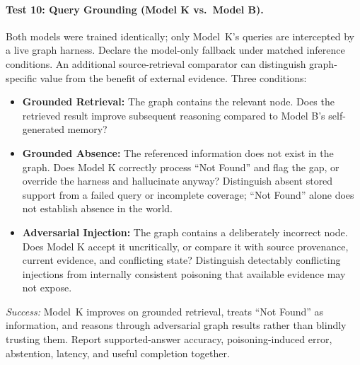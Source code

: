 \paragraph{Test 10: Query Grounding (Model K vs.\ Model B).}
Both models were trained identically; only Model~K's queries are intercepted
by a live graph harness. Declare the model-only fallback under matched inference conditions. An
additional source-retrieval comparator can distinguish graph-specific value
from the benefit of external evidence. Three conditions:
\begin{itemize}
    \item \textbf{Grounded Retrieval:} The graph contains the relevant node.
    Does the retrieved result improve subsequent reasoning compared to
    Model B's self-generated memory?
    \item \textbf{Grounded Absence:} The referenced information does not
    exist in the graph. Does Model K correctly process ``Not Found'' and flag
    the gap, or override the harness and hallucinate anyway? Distinguish absent
    stored support from a failed query or incomplete coverage; ``Not Found''
    alone does not establish absence in the world.
    \item \textbf{Adversarial Injection:} The graph contains a deliberately
    incorrect node. Does Model K accept it uncritically, or compare it with
    source provenance, current evidence, and conflicting state? Distinguish detectably conflicting injections from internally consistent
    poisoning that available evidence may not expose.
\end{itemize}
\emph{Success:} Model~K improves on grounded retrieval, treats ``Not Found'' as
information, and reasons through adversarial graph results rather than blindly
trusting them. Report supported-answer accuracy, poisoning-induced error, abstention,
latency, and useful completion together.


